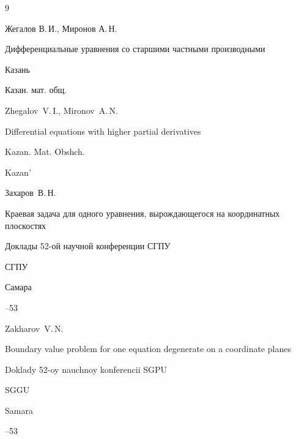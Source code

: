 \begin{thebibliography}{9}




\by Жегалов В.\,И., Миронов А.\,Н.

\book Дифференциальные уравнения со старшими частными производными

\publaddr Казань

\publ Казан. мат. общ.



\misctransl

\by Zhegalov~V.\,I., Mironov~A.\,N.

\book Differential equations with higher partial derivatives 

\publ Kazan. Mat. Obshch.

\publaddr Kazan'






\by Захаров~В.\,Н.

\paper Краевая задача для одного уравнения, вырождающегося на координатных плоскостях

\inbook Доклады 52-ой научной конференции СГПУ

\publ СГПУ

\publaddr Самара


--53

\misctransl

\by Zakharov~V.\,N.

\paper Boundary value problem for one equation degenerate on a coordinate planes

\inbook Doklady 52-oy nauchnoy konferencii SGPU 

\publ SGGU

\publaddr Samara


--53



\end{thebibliography}







\noindent

\hskip6.5cm \thedate \par\noindent

